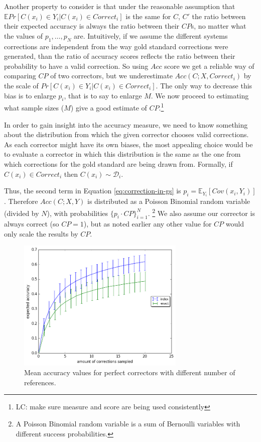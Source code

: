\documentclass[letter,11pt]{article}
\newcommand{\lc}[1]{\footnote{\color{green}LC: #1}}
\begin{document}

                Another property to consider is that under the reasonable assumption that $\mathbb{E}Pr[C(x_i) \in Y_i | C(x_i) \in Correct_i]$ is the same for $C$, $C'$ the ratio between their expected accuracy
		is always the ratio between their $CP$s, no matter what the values of $p_1,\ldots,p_N$ are. Intuitively, if we assume the different systems corrections are independent from the way gold standard corrections were generated, than the ratio of accuracy scores reflects the ratio between their probability to have a valid correction.
		So using $Acc$ score we get a reliable way of comparing $CP$ of two correctors,
		but we underestimate $Acc\left(C;X,Correct_i\right)$ by the scale of $Pr\left[C\left(x_i\right) \in Y_i | C\left(x_i\right) \in Correct_i\right]$. The only way to decrease this bias
		is to enlarge $p_i$, that is to say to enlarge $M$. 
		We now proceed to estimating what sample sizes ($M$) give a good estimate of $CP$.\lc{make sure measure and score are being used consistently}
		
		In order to gain insight into the accuracy measure, we need to know something about the distribution from which the given corrector chooses valid corrections. As each corrector might have its own biases, the most appealing choice would be to evaluate a corrector in which this distribution is the same as the one from which corrections for the gold standard are being drawn from. Formally, if $C\left(x_i\right) \in Correct_i$ then $C\left(x_i\right) \sim \mathcal{D}_i$. 
		
		Thus, the second
		term in Equation \ref{eq:correction-in-gs} is $p_i = \mathbb{E}_{Y_i}[Cov(x_i,Y_i)]$. Therefore $Acc(C;X,Y)$ is distributed as
		a Poisson Binomial random variable (divided by $N$), with probabilities $\{p_i \cdot CP\}_{i=1}^N$. \footnote{A Poisson Binomial random variable is a sum of Bernoulli variables with different success probabilities.} We also assume our corrector is always correct (so $CP=1$), but as noted earlier any other value for $CP$ would only scale the results by $CP$.
		
		\begin{figure}
			\includegraphics[width=8cm]{repeat_1000_accuracy}
			\caption{Mean accuracy values for perfect correctors with different number of references.} \label{fig:accuracy_vals}
		\end{figure}
		
\end{document}
